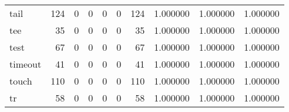 \begin{longtable}{lrrrrrrrrr}
tail      &                                       124 &                                                  0 &                                                  0 &                                                  0 &                                                  0 &                                                124 &                                           1.000000 &                               1.000000 &                             1.000000 \\
tee       &                                        35 &                                                  0 &                                                  0 &                                                  0 &                                                  0 &                                                 35 &                                           1.000000 &                               1.000000 &                             1.000000 \\
test      &                                        67 &                                                  0 &                                                  0 &                                                  0 &                                                  0 &                                                 67 &                                           1.000000 &                               1.000000 &                             1.000000 \\
timeout   &                                        41 &                                                  0 &                                                  0 &                                                  0 &                                                  0 &                                                 41 &                                           1.000000 &                               1.000000 &                             1.000000 \\
touch     &                                       110 &                                                  0 &                                                  0 &                                                  0 &                                                  0 &                                                110 &                                           1.000000 &                               1.000000 &                             1.000000 \\
tr        &                                        58 &                                                  0 &                                                  0 &                                                  0 &                                                  0 &                                                 58 &                                           1.000000 &                               1.000000 &                             1.000000 \\

\end{longtable}
